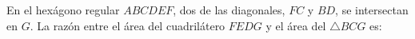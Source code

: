 En el hexágono regular $ABCDEF$, dos de las diagonales, $FC$ y $BD$, se intersectan en $G$. La razón entre el área del cuadrilátero $FEDG$ y el área del $\triangle BCG$ es: